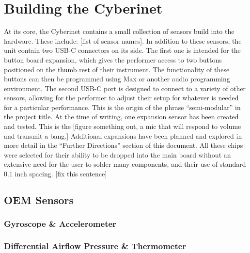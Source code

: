 

\chapter{Building the Cyberinet}

At its core, the Cyberinet contains a small collection of sensors build into the hardware. These include: [list of sensor names]. In addition to these sensors, the unit contain two USB-C connectors on its side. The first one is intended for the button board expansion, which gives the performer access to two buttons positioned on the thumb rest of their instrument. The functionality of these buttons can then be programmed using Max or another audio programming environment. The second USB-C port is designed to connect to a variety of other sensors, allowing for the performer to adjust their setup for whatever is needed for a particular performance. This is the origin of the phrase “semi-modular” in the project title. At the time of writing, one expansion sensor has been created and tested. This is the [figure something out, a mic that will respond to volume and transmit a bang.] Additional expansions have been planned and explored in more detail in the “Further Directions” section of this document. 
All these chips were selected for their ability to be dropped into the main board without an extensive need for the user to solder many components, and their use of standard 0.1 inch spacing. [fix this sentence]



\section{OEM Sensors}

\subsection{Gyroscope \& Accelerometer}


\subsection{Differential Airflow Pressure \& Thermometer}

